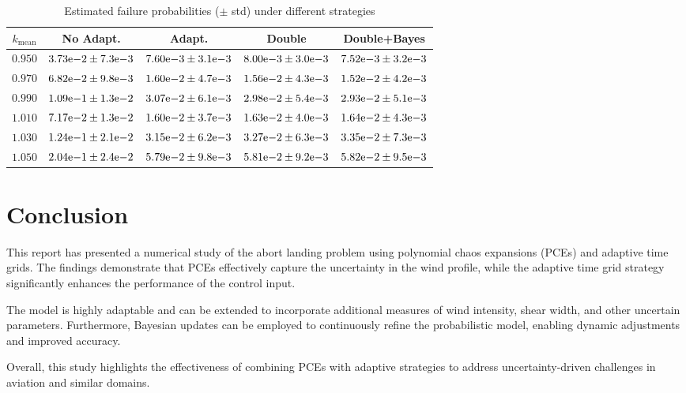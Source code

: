 \begin{table}[ht]
\label{tab:failure_probabilities}
    \centering
    \begin{tabular}{ccccc}
    \toprule
    \textbf{$k_{\text{mean}}$} & \textbf{No Adapt.} & \textbf{Adapt.} & \textbf{Double} & \textbf{Double+Bayes} \\
    \midrule
    $0.950$ & $3.73{\rm e}{-2} \pm 7.3{\rm e}{-3}$ & $7.60{\rm e}{-3} \pm 3.1{\rm e}{-3}$ & $8.00{\rm e}{-3} \pm 3.0{\rm e}{-3}$ & $7.52{\rm e}{-3} \pm 3.2{\rm e}{-3}$ \\
    \midrule
    $0.970$ & $6.82{\rm e}{-2} \pm 9.8{\rm e}{-3}$ & $1.60{\rm e}{-2} \pm 4.7{\rm e}{-3}$ & $1.56{\rm e}{-2} \pm 4.3{\rm e}{-3}$ & $1.52{\rm e}{-2} \pm 4.2{\rm e}{-3}$ \\
    \midrule
    $0.990$ & $1.09{\rm e}{-1} \pm 1.3{\rm e}{-2}$ & $3.07{\rm e}{-2} \pm 6.1{\rm e}{-3}$ & $2.98{\rm e}{-2} \pm 5.4{\rm e}{-3}$ & $2.93{\rm e}{-2} \pm 5.1{\rm e}{-3}$ \\
    \midrule
    $1.010$ & $7.17{\rm e}{-2} \pm 1.3{\rm e}{-2}$ & $1.60{\rm e}{-2} \pm 3.7{\rm e}{-3}$ & $1.63{\rm e}{-2} \pm 4.0{\rm e}{-3}$ & $1.64{\rm e}{-2} \pm 4.3{\rm e}{-3}$ \\
    \midrule
    $1.030$ & $1.24{\rm e}{-1} \pm 2.1{\rm e}{-2}$ & $3.15{\rm e}{-2} \pm 6.2{\rm e}{-3}$ & $3.27{\rm e}{-2} \pm 6.3{\rm e}{-3}$ & $3.35{\rm e}{-2} \pm 7.3{\rm e}{-3}$ \\
    \midrule
    $1.050$ & $2.04{\rm e}{-1} \pm 2.4{\rm e}{-2}$ & $5.79{\rm e}{-2} \pm 9.8{\rm e}{-3}$ & $5.81{\rm e}{-2} \pm 9.2{\rm e}{-3}$ & $5.82{\rm e}{-2} \pm 9.5{\rm e}{-3}$ \\
    \bottomrule
    \end{tabular}
    \caption{Estimated failure probabilities ($\pm$ std) under different strategies}
\end{table}

\section{Conclusion}

This report has presented a numerical study of the abort landing problem using polynomial chaos expansions (PCEs) and adaptive time grids. The findings demonstrate that PCEs effectively capture the uncertainty in the wind profile, while the adaptive time grid strategy significantly enhances the performance of the control input.

The model is highly adaptable and can be extended to incorporate additional measures of wind intensity, shear width, and other uncertain parameters. Furthermore, Bayesian updates can be employed to continuously refine the probabilistic model, enabling dynamic adjustments and improved accuracy.

Overall, this study highlights the effectiveness of combining PCEs with adaptive strategies to address uncertainty-driven challenges in aviation and similar domains.